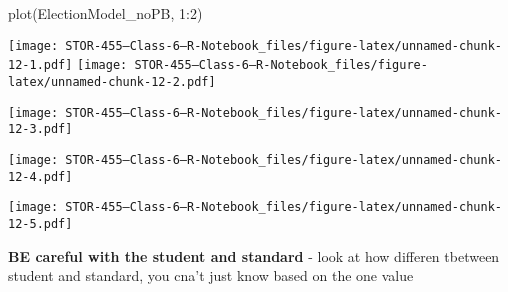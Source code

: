 \documentclass[
]{article}
\newenvironment{Shaded}{\begin{snugshade}}{\end{snugshade}}
\newcommand{\AttributeTok}[1]{\textcolor[rgb]{0.77,0.63,0.00}{#1}}
\newcommand{\ConstantTok}[1]{\textcolor[rgb]{0.00,0.00,0.00}{#1}}
\newcommand{\DecValTok}[1]{\textcolor[rgb]{0.00,0.00,0.81}{#1}}
\newcommand{\FunctionTok}[1]{\textcolor[rgb]{0.00,0.00,0.00}{#1}}
\newcommand{\NormalTok}[1]{#1}
\newcommand{\SpecialCharTok}[1]{\textcolor[rgb]{0.00,0.00,0.00}{#1}}
\begin{document}
\begin{Shaded}
\begin{Highlighting}[]
\FunctionTok{plot}\NormalTok{(ElectionModel\_noPB, }\DecValTok{1}\SpecialCharTok{:}\DecValTok{2}\NormalTok{)}
\end{Highlighting}
\end{Shaded}

\texttt{[image: STOR-455---Class-6---R-Notebook\_files/figure-latex/unnamed-chunk-12-1.pdf]}
\texttt{[image: STOR-455---Class-6---R-Notebook\_files/figure-latex/unnamed-chunk-12-2.pdf]}

\begin{Shaded}
\end{Shaded}

\texttt{[image: STOR-455---Class-6---R-Notebook\_files/figure-latex/unnamed-chunk-12-3.pdf]}

\begin{Shaded}
\end{Shaded}

\texttt{[image: STOR-455---Class-6---R-Notebook\_files/figure-latex/unnamed-chunk-12-4.pdf]}

\begin{Shaded}
\end{Shaded}

\texttt{[image: STOR-455---Class-6---R-Notebook\_files/figure-latex/unnamed-chunk-12-5.pdf]}

\textbf{BE careful with the student and standard} - look at how differen
tbetween student and standard, you cna't just know based on the one
value
\end{document}
